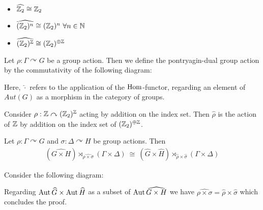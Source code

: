 \begin{Example}
	\label{the_zero_divisor_problem:pontryagin_duality:example_duals}
	\
	\begin{itemize}
		\item {$\widehat{\mathbb{Z}_2} \cong \mathbb{Z}_2$}
		\item {$\widehat{(\mathbb{Z}_2)^n} \cong (\mathbb{Z}_2)^n ~\forall n \in \mathbb{N}$}
		\item {$\widehat{(\mathbb{Z}_2)^{\mathbb{Z}}} \cong (\mathbb{Z}_2)^{\oplus \mathbb{Z}}$}
	\end{itemize}
\end{Example}

\begin{Definition}
	Let $\rho: \Gamma \curvearrowright G$ be a group action.
	Then we define the {pontryagin-dual group action} by the commutativity of the following diagram:
	\begin{figure}[H]
		\centering
		
	\end{figure}
	Here, $\widehat{\cdot}$ refers to the application of the $\operatorname{Hom}$-functor, regarding an element of $Aut(G)$ as a morphism in the category of groups.
\end{Definition}

\begin{Example}
	\label{the_zero_divisor_problem:pontryagin_duality:example_dual_action}
	Consider $\rho: \mathbb{Z} \curvearrowright (\mathbb{Z}_2)^{\mathbb{Z}}$ acting by addition on the index set.
	Then $\widehat{\rho}$ is the action of $\mathbb{Z}$ by addition on the index set of $(\mathbb{Z}_2)^{\oplus \mathbb{Z}}$.
\end{Example}

\begin{Lemma}
	\label{the_zero_divisor_problem:pontryagin_duality:lemma_product_of_dual_group_actions}
	Let $\rho: \Gamma \curvearrowright G$ and $\sigma: \Delta \curvearrowright H$ be group actions. Then
	\begin{align*}
		(\widehat{G \times H}) \rtimes_{\widehat{\rho \times \sigma}} (\Gamma \times \Delta) ~\cong~ (\widehat{G} \times \widehat{H}) \rtimes_{\widehat{\rho} \times \widehat{\sigma}} (\Gamma \times \Delta)
	\end{align*}
\end{Lemma}

\proof
	Consider the following diagram:
	\begin{figure}[H]
		\centering
		
	\end{figure}
	Regarding $\operatorname{Aut}{\widehat{G}} \times \operatorname{Aut}{\widehat{H}}$ as a subset of $\operatorname{Aut} \widehat{G \times H}$ we have $\widehat{\rho \times \sigma} = \widehat{\rho} \times \widehat{\sigma}$ which concludes the proof.
\endproof

